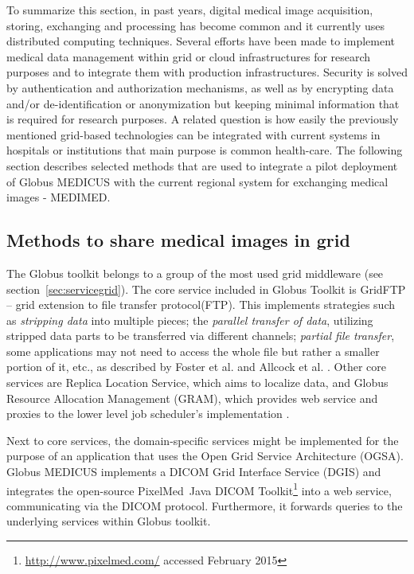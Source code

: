 
To summarize this section, in past years, digital medical image acquisition, storing, exchanging and processing has become common and it currently uses distributed computing techniques. Several efforts have been made to implement medical data management within grid or cloud infrastructures for research purposes and to integrate them with production infrastructures. Security is solved by authentication and authorization mechanisms, as well as by encrypting data and/or de-identification or anonymization but keeping minimal information that is required for research purposes. A related question is how easily the previously mentioned grid-based technologies can be integrated with current systems in hospitals or institutions that main purpose is common health-care. The following section describes selected methods that are used to integrate a pilot deployment of Globus MEDICUS with the current regional system for exchanging medical images - MEDIMED.

\subsection{Methods to share medical images in grid}
\label{sec:methodsimages}

The Globus toolkit belongs to a group of the most used grid middleware (see section~\ref{sec:servicegrid}). The core service included in Globus Toolkit is GridFTP -- grid extension to file transfer protocol(FTP). This implements strategies such as \emph{stripping data} into multiple pieces; the \emph{parallel transfer of data}, utilizing stripped data parts to be transferred via different channels; \emph{partial file transfer}, some applications may not need to access the whole file but rather a smaller portion of it, etc., as described by Foster et al. and Allcock et al. \cite{Foster2006, Allcock2005}. Other core services are Replica Location Service, which aims to localize data, and Globus Resource Allocation Management (GRAM), which provides web service and proxies to the lower level job scheduler's implementation \cite{Foster2006}.

Next to core services, the domain-specific services might be implemented for the purpose of an application that uses the Open Grid Service Architecture (OGSA). Globus MEDICUS \cite{Erberich2006,Erberich2007} implements a DICOM Grid Interface Service (DGIS) and integrates the open-source PixelMed\texttrademark ~Java DICOM Toolkit\footnote{\url{http://www.pixelmed.com/} accessed February 2015} into a web service, communicating via the DICOM protocol. Furthermore, it forwards queries to the underlying services within Globus toolkit. 

